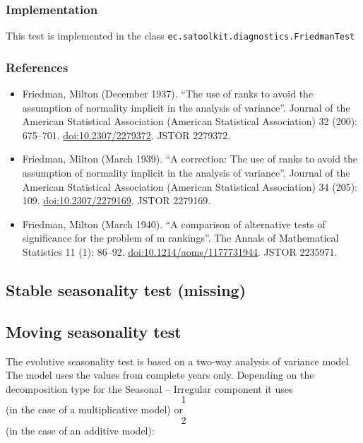 \documentclass[
]{book}
\begin{document}
\hypertarget{implementation-2}{%
\subsubsection{Implementation}\label{implementation-2}}

This test is implemented in the class \texttt{ec.satoolkit.diagnostics.FriedmanTest}

\hypertarget{references-3}{%
\subsubsection{References}\label{references-3}}

\begin{itemize}
\item
  Friedman, Milton (December 1937). ``The use of ranks to avoid the assumption of normality implicit in the analysis of variance''. Journal of the American Statistical Association (American Statistical Association) 32 (200): 675--701. \url{doi:10.2307/2279372}. JSTOR 2279372.
\item
  Friedman, Milton (March 1939). ``A correction: The use of ranks to avoid the assumption of normality implicit in the analysis of variance''. Journal of the American Statistical Association (American Statistical Association) 34 (205): 109. \url{doi:10.2307/2279169}. JSTOR 2279169.
\item
  Friedman, Milton (March 1940). ``A comparison of alternative tests of significance for the problem of m rankings''. The Annals of Mathematical Statistics 11 (1): 86--92. \url{doi:10.1214/aoms/1177731944}. JSTOR 2235971.
\end{itemize}

\hypertarget{stable-seasonality-test-missing}{%
\subsection{Stable seasonality test (missing)}\label{stable-seasonality-test-missing}}

\hypertarget{moving-seasonality-test}{%
\subsection{Moving seasonality test}\label{moving-seasonality-test}}

The evolutive seasonality test is based on a two-way analysis of
variance model. The model uses the values from complete years only.
Depending on the decomposition type for the Seasonal -- Irregular
component it uses \[1\] (in the case of a multiplicative model) or
\[2\] (in the case of an additive model):
\end{document}
